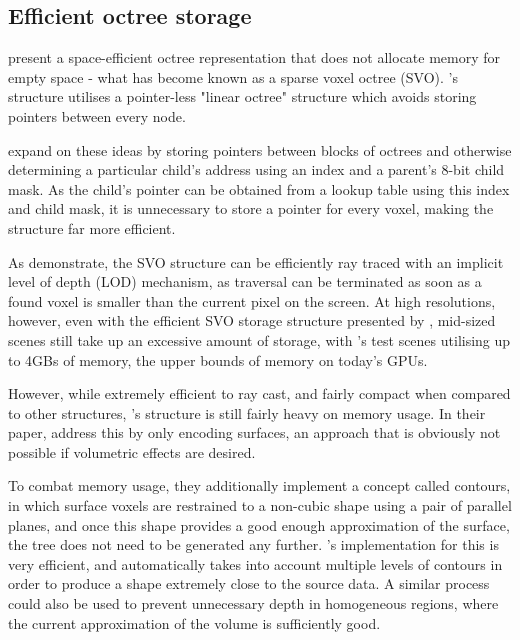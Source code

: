 \subsection{Efficient octree storage}
\cite{wilhelms00octreesfor} present a space-efficient octree representation that does not allocate memory for empty space - what has become known as a sparse voxel octree (SVO). \citeauthor{wilhelms00octreesfor}'s structure utilises a pointer-less "linear octree" structure which avoids storing pointers between every node.

\cite{laine10efficientsvos} expand on these ideas by storing pointers between blocks of octrees and otherwise determining a particular child's address using an index and a parent's 8-bit child mask. As the child's pointer can be obtained from a lookup table using this index and child mask, it is unnecessary to store a pointer for every voxel, making the structure far more efficient.

As \citeauthor{laine10efficientsvos} demonstrate, the SVO structure can be efficiently ray traced with an implicit level of depth (LOD) mechanism, as traversal can be terminated as soon as a found voxel is smaller than the current pixel on the screen. At high resolutions, however, even with the efficient SVO storage structure presented by \citeauthor{laine10efficientsvos}, mid-sized scenes still take up an excessive amount of storage, with \citeauthor{laine10efficientsvos}'s test scenes utilising up to 4GBs of memory, the upper bounds of memory on today's GPUs.

However, while extremely efficient to ray cast, and fairly compact when compared to other structures, \citeauthor{laine10efficientsvos}'s structure is still fairly heavy on memory usage. In their paper, \citeauthor{laine10efficientsvos} address this by only encoding surfaces, an approach that is obviously not possible if volumetric effects are desired.

To combat memory usage, they additionally implement a concept called contours, in which surface voxels are restrained to a non-cubic shape using a pair of parallel planes, and once this shape provides a good enough approximation of the surface, the tree does not need to be generated any further. \citeauthor{laine10efficientsvos}'s implementation for this is very efficient, and automatically takes into account multiple levels of contours in order to produce a shape extremely close to the source data. A similar process could also be used to prevent unnecessary depth in homogeneous regions, where the current approximation of the volume is sufficiently good.

